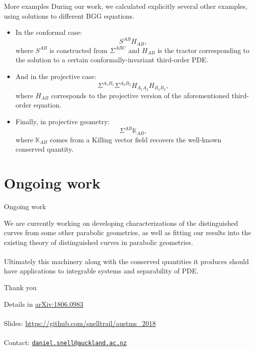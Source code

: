 \documentclass{beamer}
\begin{document}
\begin{frame}{More examples}
  During our work, we calculated explicitly several other examples, using
  solutions to different BGG equations.\\
  \begin{itemize}
    \pause
    \item In the conformal case:
      \[
      S^{AB} H_{AB},
      \]
      where \( S^{AB} \) is constructed from \( \Sigma^{ABC} \) and
      \( H_{AB} \) is the tractor corresponding to the solution to a certain
      conformally-invariant third-order PDE.
    \pause
    \item And in the projective case:
      \[
        \Sigma^{A_1 B_1} \Sigma^{A_2 B_2} H_{A_1
        A_2} H_{B_1 B_2},
      \]
      where \( H_{A B} \) corresponds to the projective version of the
      aforementioned third-order equation.\\
      \pause
    \item Finally, in projective geometry:
      \[
        \Sigma^{A B} \mathbb{K}_{A B},
      \]
      where \( \mathbb{K}_{A B} \) comes from a Killing vector field recovers the well-known conserved quantity.
  \end{itemize}
\end{frame}

\section{Ongoing work}

\begin{frame}{Ongoing work}
  \begin{block}{}
    We are currently working on developing characterizations of the distinguished curves from some other parabolic geometries, as well as fitting our results into the existing theory of distinguished curves in parabolic geometries. \\
    \hspace{1em}\\
    \pause
    Ultimately this machinery along with the conserved quantities it produces should have applications to integrable systems and separability of PDE.
  \end{block}
\end{frame}

\begin{frame}{Thank you}
  \begin{block}{}
  Details in \href{https://arxiv.org/abs/1806.09830}{arXiv:1806.0983}\\
  \hspace{1em}\\
  Slides: \href{https://github.com/snelltrail/austms_2018}{https://github.com/snelltrail/austms\_2018}\\
  \hspace{1em}\\
  Contact: \texttt{\href{mailto:daniel.snell@auckland.ac.nz}{daniel.snell@auckland.ac.nz}}
  \end{block}
\end{frame}
\end{document}
